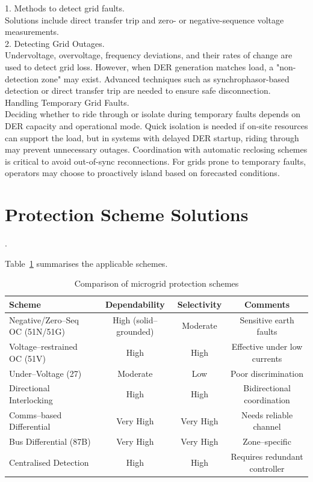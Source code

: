  1. Methods to detect grid faults.\\
 Solutions include direct transfer trip and zero- or negative-sequence voltage measurements.\\
2. Detecting Grid Outages.\\
 Undervoltage, overvoltage, frequency deviations, and their rates of change are used to detect grid loss. However, when DER generation matches load, a "non-detection zone" may exist. Advanced techniques such as synchrophasor-based detection or direct transfer trip are needed to ensure safe disconnection.\\
Handling Temporary Grid Faults.\\
 Deciding whether to ride through or isolate during temporary faults depends on DER capacity and operational mode. Quick isolation is needed if on-site resources can support the load, but in systems with delayed DER startup, riding through may prevent unnecessary outages. Coordination with automatic reclosing schemes is critical to avoid out-of-sync reconnections. For grids prone to temporary faults, operators may choose to proactively island based on forecasted conditions.

\section{Protection Scheme Solutions}.

Table~\ref{tab:schemes} summarises the applicable schemes.

\begin{table}[h!]
\centering
\caption{Comparison of microgrid protection schemes}
\label{tab:schemes}
\begin{tabular}{|l|c|c|c|}
\hline
\textbf{Scheme} & \textbf{Dependability} & \textbf{Selectivity} & \textbf{Comments} \\ \hline
Negative/Zero–Seq OC (51N/51G) & High (solid–grounded) & Moderate & Sensitive earth faults \\
Voltage–restrained OC (51V) & High & High & Effective under low currents \\
Under–Voltage (27) & Moderate & Low & Poor discrimination \\
Directional Interlocking & High & High & Bidirectional coordination \\
Comms–based Differential & Very High & Very High & Needs reliable channel \\
Bus Differential (87B) & Very High & Very High & Zone–specific \\
Centralised Detection & High & High & Requires redundant controller \\
\hline
\end{tabular}
\end{table}

